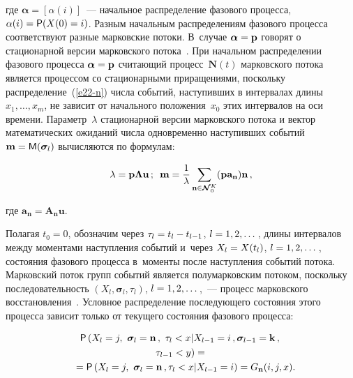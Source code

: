 {\begin{multicols}{2}
  \vspace*{-4pt}
  
  \noindent
где $\boldsymbol{\alpha}=[\alpha(i)]$~--- начальное распределение фазового процесса, 
$\alpha(i)\hm= {\sf P}(X(0)\hm=i)$. Разным начальным распределениям фазового 
процесса соответствуют разные марковские потоки. В~случае $\boldsymbol{\alpha}
\hm= 
\mathbf{p}$ говорят о стационарной версии марковского потока~\cite{23-n}. 
При начальном распределении фазового процесса $\boldsymbol{\alpha}\hm=\mathbf{p}$ 
считающий процесс~$\mathbf{N}(t)$ марковского потока является процессом 
со стационарными приращениями, поскольку распределение~(\ref{e22-n}) 
числа событий, наступивших в интервалах длины $x_1,\ldots ,x_m$, не зависит 
от начального положения~$x_0$ этих интервалов на оси времени. 
Параметр~$\lambda$ стационарной версии марковского потока и вектор 
математических ожиданий числа одновременно наступивших событий 
$\mathbf{m}\hm= {\sf M} (\boldsymbol{\sigma}_l)$ 
вычисляются по формулам:

\vspace*{2pt}

\noindent
\begin{equation*}
\lambda=\mathbf{p}\boldsymbol{\Lambda} \mathbf{u}\,;\enskip
\mathbf{m}=\displaystyle\frac{\displaystyle 1\mathstrut}{\displaystyle \lambda\mathstrut}\sum\limits_{\mathbf{n}\in 
\boldsymbol{\mathcal{N}}_0^K} 
(\mathbf{p}\mathbf{a}_{\mathbf{n}})\mathbf{n}\,,
\end{equation*}

\vspace*{-4pt}

\noindent
где $\mathbf{a}_{\mathbf{n}}=\mathbf{A}_{\mathbf{n}}\mathbf{u}$. 
  
  Полагая $t_0=0$, обозначим через $\tau_l\hm= t_l\hm- t_{l-1}$, 
$l\hm=1,2,\ldots$\,, длины интервалов между моментами наступления событий 
и~через $X_l\hm= X(t_l)$, $l\hm=1,2,\ldots$\,, состояния фазового процесса 
в~моменты после наступления событий потока. Марковский поток групп 
событий является полумарковским потоком, поскольку последовательность 
$(X_l, \boldsymbol{\sigma}_l,\tau_l)$, $l\hm=1,2,\ldots$\,,~--- процесс марковского 
восстановления~\cite{25-n}. Условное распределение последующего состояния 
этого процесса зависит только от текущего состояния фазового процесса:

\vspace*{-3pt}

\noindent
  \begin{multline*}
  {\sf P}\left(X_l=j,\ \boldsymbol{\sigma}_l=\mathbf{n}\,,\ 
  \tau_l<x\vert X_{l-1}=i\,, \boldsymbol{\sigma}_{l-1} =\mathbf{k}\,,\right.\\
\left.  \tau_{l-1}<y\right)={}\\
{}=
   {\sf P} \left( X_l=j,\ \boldsymbol{\sigma}_l=\mathbf{n}\,,\tau_l<x\vert 
X_{l-1}=i\right) = G_{\mathbf{n}}(i,j,x).\hspace*{-6.44518pt}
  \end{multline*}
  

\end{multicols}}
